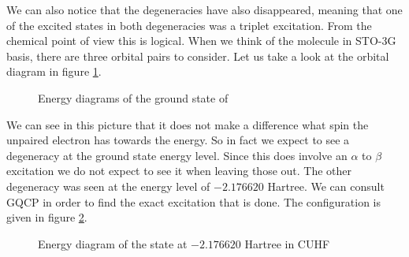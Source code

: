 \documentclass[twoside,twocolumn,9pt]{article}
\begin{document}
We can also notice that the degeneracies have also disappeared, meaning that one of the excited states in both degeneracies was a triplet excitation. From the chemical point of view
this is logical. When we think of the  molecule in STO-3G basis, there are three orbital pairs to consider. Let us take a look at the orbital diagram in figure \ref{fig:energydiag1}.
\begin{figure}[h]
  \begin{center}
  \end{center}
  \caption{Energy diagrams of the ground state of }
  \label{fig:energydiag1}
\end{figure}
We can see in this picture that it does not make a difference what spin the unpaired electron has towards the energy. So in fact we expect to see a degeneracy at the ground state
energy level. Since this does involve an $\alpha$ to $\beta$ excitation we do not expect to see it when leaving those out. The other degeneracy was seen at the energy level of $-2.176620$
Hartree. We can consult GQCP in order to find the exact excitation that is done. The configuration is given in figure \ref{fig:energydiag2}.
\begin{figure}[h]
  \begin{center}
  \end{center}
  \caption{Energy diagram of the state at $-2.176620$ Hartree in CUHF}
  \label{fig:energydiag2}
\end{figure}
\end{document}
